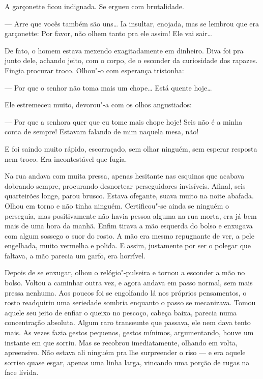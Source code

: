 A garçonette ficou indignada. Se ergueu com brutalidade.

--- Arre que vocês também são uns\ldots{} Ia insultar, enojada, mas se
lembrou que era garçonette: Por favor, não olhem tanto pra ele assim!
Ele vai sair\ldots{}

De fato, o homem estava mexendo exagitadamente em dinheiro. Diva foi pra
junto dele, achando jeito, com o corpo, de o esconder da curiosidade dos
rapazes. Fingia procurar troco. Olhou"-o com esperança tristonha:

--- Por que o senhor não toma mais um chope\ldots{} Está quente hoje\ldots{}

Ele estremeceu muito, devorou"-a com os olhos angustiados:

--- Por que a senhora quer que eu tome mais chope hoje! Seis não é a
minha conta de sempre! Estavam falando de mim naquela mesa, não!

E foi saindo muito rápido, escorraçado, sem olhar ninguém, sem esperar
resposta nem troco. Era incontestável que fugia.

Na rua andava com muita pressa, apenas hesitante nas esquinas que
acabava dobrando sempre, procurando desnortear perseguidores invisíveis.
Afinal, seis quarteirões longe, parou brusco. Estava ofegante, suava
muito na noite abafada. Olhou em torno e não tinha ninguém.
Certificou"-se ainda se ninguém o perseguia, mas positivamente não havia
pessoa alguma na rua morta, era já bem mais de uma hora da manhã. Enfim
tirava a mão esquerda do bolso e enxugava com algum sossego o suor do
rosto. A mão era mesmo repugnante de ver, a pele engelhada, muito
vermelha e polida. E assim, justamente por ser o polegar que faltava, a
mão parecia um garfo, era horrível.

Depois de se enxugar, olhou o relógio"-pulseira e tornou a esconder a mão
no bolso. Voltou a caminhar outra vez, e agora andava em passo normal,
sem mais pressa nenhuma. Aos poucos foi se engolfando lá nos próprios
pensamentos, o rosto readquiriu uma seriedade sombria enquanto o passo
se mecanizava. Tomou aquele seu jeito de enfiar o queixo no pescoço,
cabeça baixa, parecia numa concentração absoluta. Algum raro transeunte
que passava, ele nem dava tento mais. As vezes fazia gestos pequenos,
gestos mínimos, argumentando, houve um instante em que sorriu. Mas se
recobrou imediatamente, olhando em volta, apreensivo. Não estava ali
ninguém pra lhe surpreender o riso --- e era aquele sorriso quase esgar,
apenas uma linha larga, vincando uma porção de rugas na face lívida.

